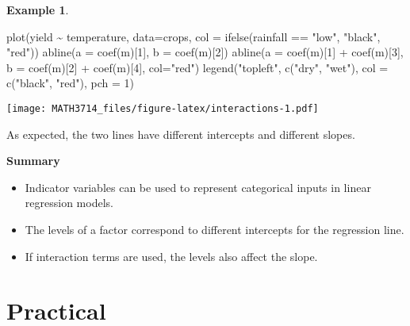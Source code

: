 \documentclass[
  a4paper,
]{article}
\newenvironment{Shaded}{\begin{snugshade}}{\end{snugshade}}
\newcommand{\AttributeTok}[1]{\textcolor[rgb]{0.77,0.63,0.00}{#1}}
\newcommand{\DecValTok}[1]{\textcolor[rgb]{0.00,0.00,0.81}{#1}}
\newcommand{\FunctionTok}[1]{\textcolor[rgb]{0.00,0.00,0.00}{#1}}
\newcommand{\NormalTok}[1]{#1}
\newcommand{\SpecialCharTok}[1]{\textcolor[rgb]{0.00,0.00,0.00}{#1}}
\newcommand{\StringTok}[1]{\textcolor[rgb]{0.31,0.60,0.02}{#1}}
\providecommand{\tightlist}{%
  \setlength{\itemsep}{0pt}\setlength{\parskip}{0pt}}
\theoremstyle{definition}
\theoremstyle{definition}
\newtheorem{example}{Example}[section]
\theoremstyle{definition}
\theoremstyle{definition}
\theoremstyle{remark}
\begin{document}
\begin{example}
\begin{Shaded}
\begin{Highlighting}[]
\FunctionTok{plot}\NormalTok{(yield }\SpecialCharTok{\textasciitilde{}}\NormalTok{ temperature, }\AttributeTok{data=}\NormalTok{crops,}
     \AttributeTok{col =} \FunctionTok{ifelse}\NormalTok{(rainfall }\SpecialCharTok{==} \StringTok{"low"}\NormalTok{, }\StringTok{"black"}\NormalTok{, }\StringTok{"red"}\NormalTok{))}
\FunctionTok{abline}\NormalTok{(}\AttributeTok{a =} \FunctionTok{coef}\NormalTok{(m)[}\DecValTok{1}\NormalTok{], }\AttributeTok{b =} \FunctionTok{coef}\NormalTok{(m)[}\DecValTok{2}\NormalTok{])}
\FunctionTok{abline}\NormalTok{(}\AttributeTok{a =} \FunctionTok{coef}\NormalTok{(m)[}\DecValTok{1}\NormalTok{] }\SpecialCharTok{+} \FunctionTok{coef}\NormalTok{(m)[}\DecValTok{3}\NormalTok{], }\AttributeTok{b =} \FunctionTok{coef}\NormalTok{(m)[}\DecValTok{2}\NormalTok{] }\SpecialCharTok{+} \FunctionTok{coef}\NormalTok{(m)[}\DecValTok{4}\NormalTok{],}
       \AttributeTok{col=}\StringTok{"red"}\NormalTok{)}
\FunctionTok{legend}\NormalTok{(}\StringTok{"topleft"}\NormalTok{, }\FunctionTok{c}\NormalTok{(}\StringTok{"dry"}\NormalTok{, }\StringTok{"wet"}\NormalTok{),}
       \AttributeTok{col =} \FunctionTok{c}\NormalTok{(}\StringTok{"black"}\NormalTok{, }\StringTok{"red"}\NormalTok{), }\AttributeTok{pch =} \DecValTok{1}\NormalTok{)}
\end{Highlighting}
\end{Shaded}

\texttt{[image: MATH3714\_files/figure-latex/interactions-1.pdf]}

As expected, the two lines have different intercepts and different slopes.
\end{example}

\textbf{Summary}

\begin{itemize}
\tightlist
\item
  Indicator variables can be used to represent categorical inputs
  in linear regression models.
\item
  The levels of a factor correspond to different intercepts for
  the regression line.
\item
  If interaction terms are used, the levels also affect the slope.
\end{itemize}

\clearpage

\hypertarget{practical}{%
\section*{Practical}\label{practical}}
\end{document}
